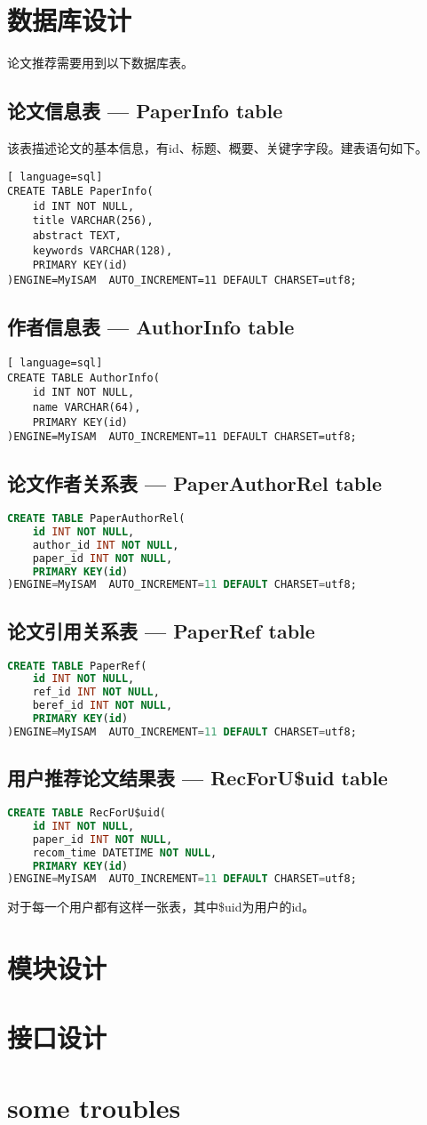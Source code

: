 \documentclass[a4paper]{article}
\begin{document}
\section{数据库设计}
论文推荐需要用到以下数据库表。
\subsection{论文信息表 --- PaperInfo table}
该表描述论文的基本信息，有id、标题、概要、关键字字段。建表语句如下。
\begin{lstlisting}[ language=sql]
CREATE TABLE PaperInfo(
    id INT NOT NULL, 
    title VARCHAR(256), 
    abstract TEXT, 
    keywords VARCHAR(128),
    PRIMARY KEY(id)
)ENGINE=MyISAM  AUTO_INCREMENT=11 DEFAULT CHARSET=utf8;
\end{lstlisting}
\subsection{作者信息表 --- AuthorInfo table}
\begin{lstlisting}[ language=sql]
CREATE TABLE AuthorInfo(
    id INT NOT NULL,
    name VARCHAR(64),
    PRIMARY KEY(id)
)ENGINE=MyISAM  AUTO_INCREMENT=11 DEFAULT CHARSET=utf8;
\end{lstlisting}
\subsection{论文作者关系表 --- PaperAuthorRel table}
\begin{lstlisting}[language=sql]
CREATE TABLE PaperAuthorRel(
    id INT NOT NULL,
    author_id INT NOT NULL,
    paper_id INT NOT NULL,
    PRIMARY KEY(id)
)ENGINE=MyISAM  AUTO_INCREMENT=11 DEFAULT CHARSET=utf8;
\end{lstlisting}
\subsection{论文引用关系表 --- PaperRef table}
\begin{lstlisting}[language=sql]
CREATE TABLE PaperRef(
    id INT NOT NULL,
    ref_id INT NOT NULL,
    beref_id INT NOT NULL,
    PRIMARY KEY(id)
)ENGINE=MyISAM  AUTO_INCREMENT=11 DEFAULT CHARSET=utf8;
\end{lstlisting}
\subsection{用户推荐论文结果表 --- RecForU\$uid table}
\begin{lstlisting}[language=sql]
CREATE TABLE RecForU$uid(
    id INT NOT NULL,
    paper_id INT NOT NULL,
    recom_time DATETIME NOT NULL,
    PRIMARY KEY(id)
)ENGINE=MyISAM  AUTO_INCREMENT=11 DEFAULT CHARSET=utf8;
\end{lstlisting}
对于每一个用户都有这样一张表，其中\$uid为用户的id。
\section{模块设计}
\section{接口设计}
\section{some troubles}
\end{document}
